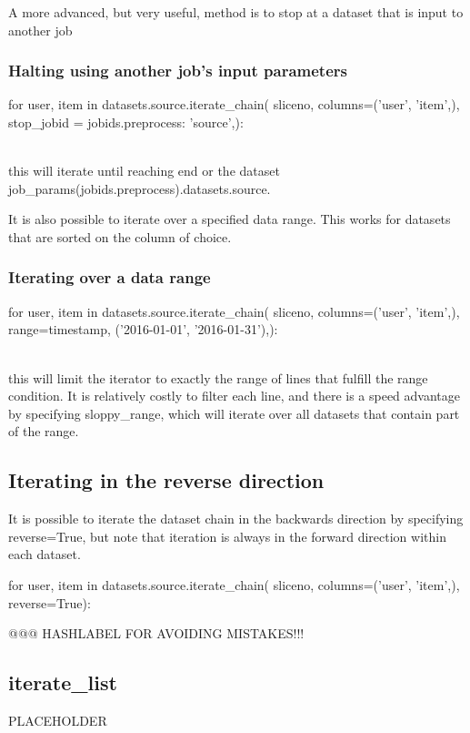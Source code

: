 A more advanced, but very useful, method is to stop at a dataset that
is input to another job

\subsubsection*{Halting using another job's input parameters}
\begin{python}
for user, item in datasets.source.iterate_chain(
    sliceno,
    columns=('user', 'item',),
    stop_jobid = {jobids.preprocess: 'source',}):
\end{python}
\\
this will iterate until reaching end or the dataset
job\_params(jobids.preprocess).datasets.source.

It is also possible to iterate over a specified data range.  This
works for datasets that are sorted on the column of choice.

\subsubsection*{Iterating over a data range}
\begin{python}
for user, item in datasets.source.iterate_chain(
    sliceno,
    columns=('user', 'item',),
    range={timestamp, ('2016-01-01', '2016-01-31'),}):
\end{python}
\\
this will limit the iterator to exactly the range of lines that
fulfill the range condition.  It is relatively costly to filter each
line, and there is a speed advantage by specifying sloppy\_range,
which will iterate over all datasets that contain part of the range.

\subsection{Iterating in the reverse direction}

It is possible to iterate the dataset chain in the backwards direction
by specifying reverse=True, but note that iteration is always in the
forward direction within each dataset.

\begin{python}
for user, item in datasets.source.iterate_chain(
    sliceno,
    columns=('user', 'item',),
    reverse=True):
\end{python}

@@@ HASHLABEL FOR AVOIDING MISTAKES!!!

\subsection{iterate\_list}
PLACEHOLDER


